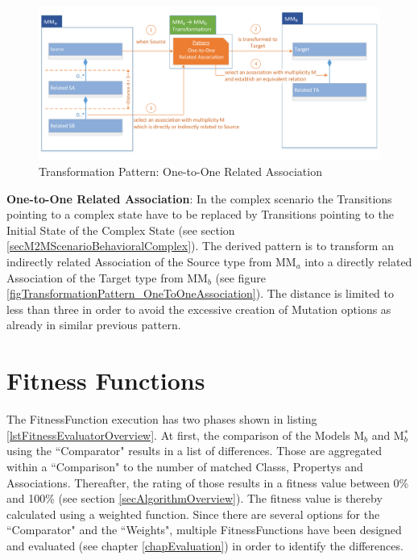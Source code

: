   
\begin{figure}[!ht]
	\centering
	\includegraphics[scale=0.48, trim=0cm 0cm 0cm 0cm, clip=true]{Images/TransformationPattern_OneToOneRelatedAssociation.pdf} 
	\caption{Transformation Pattern: One-to-One Related Association}
	\label{figTransformationPattern_OneToOneRelatedAssociation}
\end{figure}

\textbf{One-to-One Related Association}: In the complex scenario the Transitions pointing to a complex state have to be replaced by Transitions pointing to the Initial State of the Complex State (see section \ref{secM2MScenarioBehavioralComplex}). The derived pattern is to transform an indirectly related \gls{Association} of the Source type from MM$_a$ into a directly related \gls{Association} of the Target type from MM$_b$ (see figure \ref{figTransformationPattern_OneToOneAssociation}). The distance is limited to less than three in order to avoid the excessive creation of \gls{Mutation} options as already in similar previous pattern. 

   


\section{Fitness Functions}
\label{secFitnessFunctions}

The \gls{FitnessFunction} execution has two phases shown in listing \ref{lstFitnessEvaluatorOverview}. At first, the comparison of the \glspl{Model} M$_b$ and M$_b^*$ using the ``Comparator" results in a list of differences. Those are aggregated within a ``Comparison" to the number of matched \glspl{Class}, \glspl{Property} and \glspl{Association}. Thereafter, the rating of those results in a fitness value between 0\% and 100\% (see section \ref{secAlgorithmOverview}). The fitness value is thereby calculated using a weighted function. Since there are several options for the ``Comparator" and the ``Weights", multiple \glspl{FitnessFunction} have been designed and evaluated (see chapter \ref{chapEvaluation}) in order to identify the differences.

